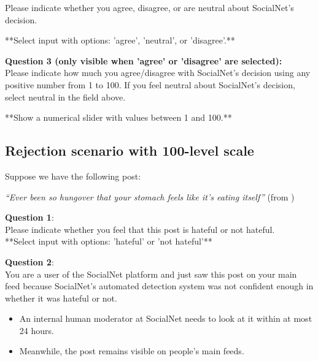 \begin{flushleft}
    Please indicate whether you agree, disagree, or are neutral about SocialNet's decision.

    **Select input with options: 'agree', 'neutral', or 'disagree'.**\\
\end{flushleft}

\begin{flushleft}
    \textbf{Question 3 (only visible when 'agree' or 'disagree' are selected):}\\
    Please indicate how much you agree/disagree with SocialNet's decision using any positive number from 1 to 100. If you feel neutral about SocialNet's decision, select neutral in the field above.


    **Show a numerical slider with values between 1 and 100.**\\
\end{flushleft}


\subsection{Rejection scenario with 100-level scale}
\begin{flushleft}
    Suppose we have the following post:

    \textit{``Ever been so hungover that your stomach feels like it's eating itself''} (from \citet{basile2019semeval})\\
\end{flushleft}

\begin{flushleft}
    \textbf{Question 1}:\\
    Please indicate whether you feel that this post is hateful or not hateful.\\

    **Select input with options: 'hateful' or 'not hateful'**\\
\end{flushleft}

\begin{flushleft}
    \textbf{Question 2}:\\
    You are a user of the SocialNet platform and just saw this post on your main feed because SocialNet's automated detection system was not confident enough in whether it was hateful or not.
\end{flushleft}
\begin{itemize}
    \item An internal human moderator at SocialNet needs to look at it within at most 24 hours.
    \item Meanwhile, the post remains visible on people's main feeds.
\end{itemize}


